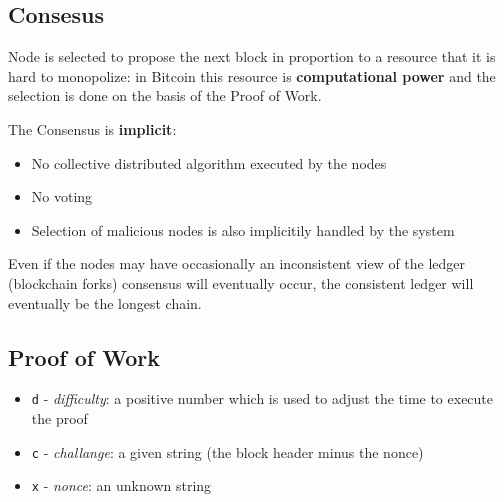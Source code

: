 
\subsection{Consesus}
Node is selected to propose the next block in proportion to a resource that it is hard to
monopolize: in Bitcoin this resource is \textbf{computational power} and the selection is done on the basis of the Proof of Work.

The Consensus is \textbf{implicit}:
\begin{itemize}
   \item No collective distributed algorithm executed by the nodes
   \item No voting
   \item Selection of malicious nodes is also implicitily handled by the system
\end{itemize}

Even if the nodes may have occasionally an inconsistent view of the ledger (blockchain forks) consensus will eventually occur, the consistent ledger will eventually be the longest chain.

\subsection{Proof of Work}
\begin{itemize}
   \item \texttt{d} - \textit{difficulty}: a positive number which is used to adjust the time to execute the proof
   \item \texttt{c} - \textit{challange}: a given string (the block header minus the nonce)
   \item \texttt{x} - \textit{nonce}: an unknown string
\end{itemize}

